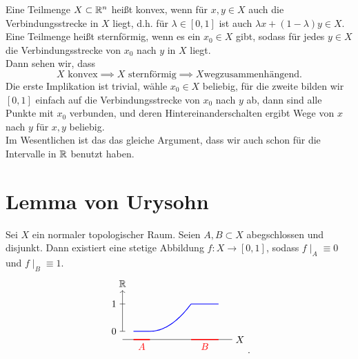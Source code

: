 \begin{dexample}
    Eine Teilmenge $X\subset \mathbb{R}^n$ heißt konvex, wenn für $x,y\in X$ auch die Verbindungsstrecke in $X$ liegt, d.h. für  $λ\in [0,1]$ ist auch $λx + (1-λ)y \in X$. Eine Teilmenge heißt sternförmig, wenn es ein $x_0\in X$ gibt, sodass für jedes $y\in X$ die Verbindungsstrecke von $x_0$ nach $y$ in  $X$ liegt. \\
    Dann sehen wir, dass
    \[
    X \text{ konvex}\implies X \text{ sternförmig} \implies X \text{wegzusammenhängend}
    .\] 
    Die erste Implikation ist trivial, wähle $x_0\in X$ beliebig, für die zweite bilden wir $[0,1]$ einfach auf die Verbindungsstrecke von  $x_0$ nach $y$ ab, dann sind alle Punkte mit  $x_0$ verbunden, und deren Hintereinanderschalten ergibt Wege von $x$ nach  $y$ für  $x,y$ beliebig. \\
    Im Wesentlichen ist das das gleiche Argument, dass wir auch schon für die Intervalle in $\mathbb{R}$ benutzt haben.
\end{dexample}

\section{Lemma von Urysohn}

\begin{theorem}\label{thm:urysohn}
    Sei $X$ ein normaler topologischer Raum. Seien  $A,B\subset X$ abegschlossen und disjunkt. Dann existiert eine stetige Abbildung $f: X \to  [0,1]$, sodass $f\mid _A \equiv 0 $ und $f\mid _{B} \equiv  1$.
    \[
\begin{tikzpicture}
    \draw (0,-0.3) -- (4,-0.3) node[anchor=west] {$X$};
    \draw[red,very thick] (0.4,-0.3) -- (1, -0.3) node[midway, anchor = north] {$A$};
    \draw[red, very thick] (2.5,-0.3) -- (3.5, -0.3) node[midway, anchor = north] {$B$};
    \draw[->] (0,0) -- (0,1.5) node[anchor=south] {$\R$};
    \draw (-0.1,0) node[anchor = east] {$0$}-- (0.1,0);
    \draw (-0.1,1) node[anchor=east] {$1$}-- (0.1,1);
    \draw[blue, thick] (0.4,0)-- (1,0);
    \draw[blue, thick] (2.5,1) -- (3.5,1);
    \draw[blue, thick, smooth, domain = 1:2.5,variable=\x] plot ({\x},{(\x-1)^2/2.25});
\end{tikzpicture}
    .\] 
\end{theorem}


